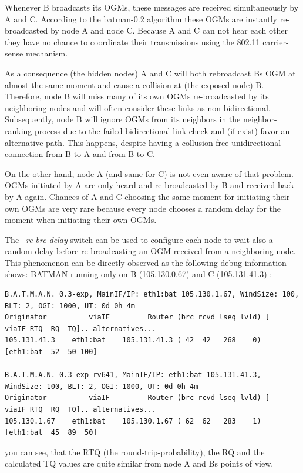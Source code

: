 \documentclass[11pt]{article}
\begin{document}
Whenever B broadcasts its OGMs, these messages are received simultaneously by A and C. According to the batman-0.2 algorithm these OGMs are instantly re-broadcasted by node A and node C. Because A and C can not hear each other they have no chance to coordinate their transmissions using the 802.11 carrier-sense mechanism.

As a consequence (the hidden nodes) A and C will both rebroadcast Bs OGM at almost the same moment and cause a collision at (the exposed node) B. Therefore, node B will miss many of its own OGMs re-broadcasted by its neighboring nodes and will often consider these links as non-bidirectional. Subsequently, node B will ignore OGMs from its neighbors in the neighbor-ranking process due to the failed bidirectional-link check and (if exist) favor an alternative path. This happens, despite having a collusion-free unidirectional connection from B to A and from B to C.

On the other hand, node A (and same for C) is not even aware of that problem. OGMs initiated by A are only heard and re-broadcasted by B and received back by A again. Chances of A and C choosing the same moment for initiating their own OGMs are very rare because every node chooses a random delay for the moment when initiating their own OGMs.

The \emph{--re-brc-delay} switch can be used to configure each node to wait also a random delay before re-broadcasting an OGM received from a neighboring node.
%
This phenomenon can be directly observed as the following debug-information shows:
%
BATMAN running only on B (105.130.0.67) and C (105.131.41.3) :

\begin{small}
\begin{verbatim}
B.A.T.M.A.N. 0.3-exp, MainIF/IP: eth1:bat 105.130.1.67, WindSize: 100, BLT: 2, OGI: 1000, UT: 0d 0h 4m
Originator          viaIF         Router (brc rcvd lseq lvld) [   viaIF RTQ  RQ  TQ].. alternatives...
105.131.41.3    eth1:bat    105.131.41.3 ( 42  42   268    0) [eth1:bat  52  50 100]

B.A.T.M.A.N. 0.3-exp rv641, MainIF/IP: eth1:bat 105.131.41.3, WindSize: 100, BLT: 2, OGI: 1000, UT: 0d 0h 4m
Originator          viaIF         Router (brc rcvd lseq lvld) [   viaIF RTQ  RQ  TQ].. alternatives...
105.130.1.67    eth1:bat    105.130.1.67 ( 62  62   283    1) [eth1:bat  45  89  50]
\end{verbatim}
\end{small}

you can see, that the RTQ (the round-trip-probability), the RQ and the calculated TQ values
are quite similar from node A and Bs points of view.
\end{document}
